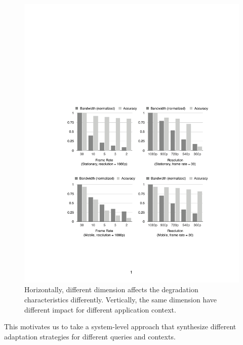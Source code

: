 \begin{figure}
  \centering
  \includegraphics[width=\linewidth]{figures/motiv.pdf}
  \caption{Horizontally, different dimension affects the degradation
    characteristics differently. Vertically, the same dimension have different
    impact for different application context.}
  \label{fig:motiv}
\end{figure}

This motivates us to take a system-level approach that synthesize different
adaptation strategies for different queries and contexts.


